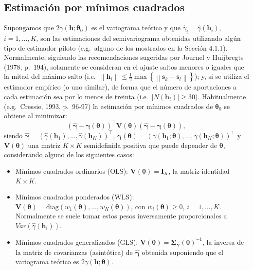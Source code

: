 \documentclass[
  spanish,
]{book}
\theoremstyle{break}
\theoremstyle{definition}
\theoremstyle{definition}
\theoremstyle{definition}
\theoremstyle{definition}
\theoremstyle{remark}
\begin{document}
\hypertarget{ls-fit}{%
\subsection{Estimación por mínimos cuadrados}\label{ls-fit}}

Supongamos que \(2\gamma(\mathbf{h};\boldsymbol{\theta}_0)\) es el variograma teórico y que \(\hat{\gamma}_{i} =\hat{\gamma}(\mathbf{h}_{i})\), \(i = 1,\ldots,K\), son las estimaciones del semivariograma obtenidas utilizando algún tipo de estimador piloto (e.g.~alguno de los mostrados en la Sección 4.1.1).
Normalmente, siguiendo las recomendaciones sugeridas por Journel y Huijbregts (1978, p.~194), solamente se consideran en el ajuste saltos menores o iguales que la mitad del máximo salto (i.e.~\(\left\| \mathbf{h}_{i} \right\| \leq \frac{1}{2} \max \left\{ \left\| \mathbf{s}_{k} -\mathbf{s}_{l} \right\| \right\}\)); y, si se utiliza el estimador empírico (o uno similar), de forma que el número de aportaciones a cada estimación sea por lo menos de treinta (i.e.~\(\left| N(\mathbf{h}_{i})\right| \geq 30\)).
Habitualmente (e.g.~Cressie, 1993, p.~96-97) la estimación por mínimos cuadrados de \(\boldsymbol{\theta}_0\) se obtiene al minimizar:
\begin{equation} 
  \left( \hat{\boldsymbol{\gamma}} - \boldsymbol{\gamma}(\boldsymbol{\theta})\right)^{\top } \mathbf{V}(\boldsymbol{\theta})\left( \hat{\boldsymbol{\gamma}} - \boldsymbol{\gamma}(\boldsymbol{\theta})\right),
  \label{eq:ls-obj}
\end{equation}
siendo \(\hat{\boldsymbol{\gamma}} =(\hat{\gamma}(\mathbf{h}_1),\ldots,\hat{\gamma} (\mathbf{h}_{K}))^\top\), \(\boldsymbol{\gamma}(\boldsymbol{\theta})=(\gamma(\mathbf{h}_1 ;\boldsymbol{\theta}),\ldots,\gamma(\mathbf{h}_{K} ;\boldsymbol{\theta}))^\top\)
y \(\mathbf{V}(\boldsymbol{\theta})\) una matriz \(K\times K\) semidefinida positiva que puede
depender de \(\boldsymbol{\theta}\), considerando alguno de los siguientes casos:

\begin{itemize}
\item
  Mínimos cuadrados ordinarios (OLS): \(\mathbf{V}(\boldsymbol{\theta}) = \mathbf{I}_{K}\),
  la matriz identidad \(K\times K\).
\item
  Mínimos cuadrados ponderados (WLS): \(\mathbf{V}(\boldsymbol{\theta}) = \text{diag}(w_1 (\boldsymbol{\theta}),\ldots,w_{K}(\boldsymbol{\theta}))\),
  con \(w_{i}(\boldsymbol{\theta})\geq 0\), \(i=1,\ldots,K\).
  Normalmente se suele tomar estos pesos inversamente proporcionales a \(Var(\hat{\gamma}(\mathbf{h}_{i}))\).
\item
  Mínimos cuadrados generalizados (GLS): \(\mathbf{V}(\boldsymbol{\theta})=\boldsymbol{\Sigma}_{\hat{\boldsymbol{\gamma}}} (\boldsymbol{\theta})^{-1}\),
  la inversa de la matriz de covarianzas (asintótica) de \(\hat{\boldsymbol{\gamma}}\) obtenida suponiendo que el variograma teórico es \(2\gamma(\mathbf{h};\boldsymbol{\theta})\).
\end{itemize}
\end{document}
